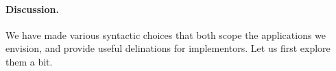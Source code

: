 

\paragraph{Discussion. }  We have made various syntactic choices that both scope the applications we envision, and provide useful delinations for implementors.  Let us first explore them a bit.  

